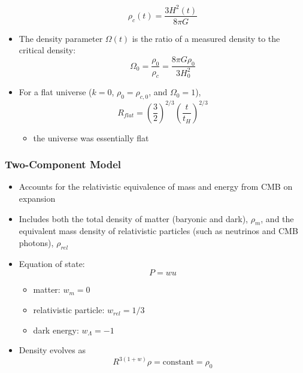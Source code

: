 \documentclass{book}
\begin{document}
\begin{itemize}
          \begin{equation*}
              \rho_c (t) = \frac{3 H^2 (t)}{8 \pi G} \tag{C\&O 29.12}
          \end{equation*}
    \item The density parameter $\Omega (t)$ is the ratio of a measured density to the critical density:
          \begin{equation*}
              \Omega_0 = \frac{\rho_0}{\rho_c} = \frac{8 \pi G \rho_0}{3 H_0^2}
          \end{equation*}
    \item For a flat universe ($k = 0$, $\rho_0 = \rho_{c,0}$, and $\Omega_0 = 1$),
          \begin{equation*}
              R_{flat} = \left( \frac{3}{2} \right)^{2/3} \left( \frac{t}{t_H} \right)^{2/3} \tag{C\&O 29.31}
          \end{equation*}
          \begin{itemize}
              \item the universe was essentially flat
          \end{itemize}
\end{itemize}
\subsubsection{Two-Component Model}
\begin{itemize}
    \item Accounts for the relativistic equivalence of mass and energy from CMB on expansion
    \item Includes both the total density of matter (baryonic and dark), $\rho_m$, and the equivalent mass density of relativistic particles (such as neutrinos and CMB photons), $\rho_{rel}$
    \item Equation of state:
          \begin{equation*}
              P = w u \tag{C\&O 29.52}
          \end{equation*}
          \begin{itemize}
              \item matter: $w_m = 0$
              \item relativistic particle: $w_{rel} = 1/3$
              \item dark energy: $w_\Lambda = -1$
          \end{itemize}
    \item Density evolves as
          \begin{equation*}
              R^{3(1 + w)} \rho = \text{constant} = \rho_0
          \end{equation*}
\end{itemize}
\end{document}

